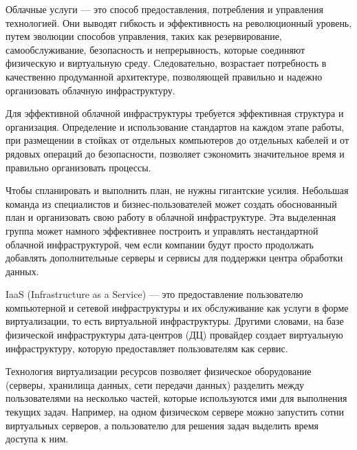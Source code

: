 Облачные услуги --- это способ предоставления, потребления и управления технологией.
Они выводят гибкость и эффективность на революционный уровень, путем эволюции способов управления, таких как резервирование, самообслуживание, безопасность и непрерывность, которые соединяют физическую и виртуальную среду.
Следовательно, возрастает потребность в качественно продуманной архитектуре, позволяющей правильно и надежно организовать облачную инфраструктуру.

Для эффективной облачной инфраструктуры требуется эффективная структура и организация.
Определение и использование стандартов на каждом этапе работы, при размещении в стойках от отдельных компьютеров до отдельных кабелей и от рядовых операций до безопасности, позволяет сэкономить значительное время и правильно организовать процессы.

Чтобы спланировать и выполнить план, не нужны гигантские усилия.
Небольшая команда из специалистов и бизнес-пользователей может создать обоснованный план и организовать свою работу в облачной инфраструктуре.
Эта выделенная группа может намного эффективнее построить и управлять нестандартной облачной инфраструктурой, чем если компании будут просто продолжать добавлять дополнительные серверы и сервисы для поддержки центра обработки данных.

IaaS (Infrastructure as a Service) --- это предоставление пользователю компьютерной и сетевой инфраструктуры и их обслуживание как услуги в форме виртуализации, то есть виртуальной инфраструктуры.
Другими словами, на базе физической инфраструктуры дата-центров (ДЦ) провайдер создает виртуальную инфраструктуру, которую предоставляет пользователям как сервис.

Технология виртуализации ресурсов позволяет физическое оборудование (серверы, хранилища данных, сети передачи данных) разделить между пользователями на несколько частей, которые используются ими для выполнения текущих задач.
Например, на одном физическом сервере можно запустить сотни виртуальных серверов, а пользователю для решения задач выделить время доступа к ним.

\clearpage
